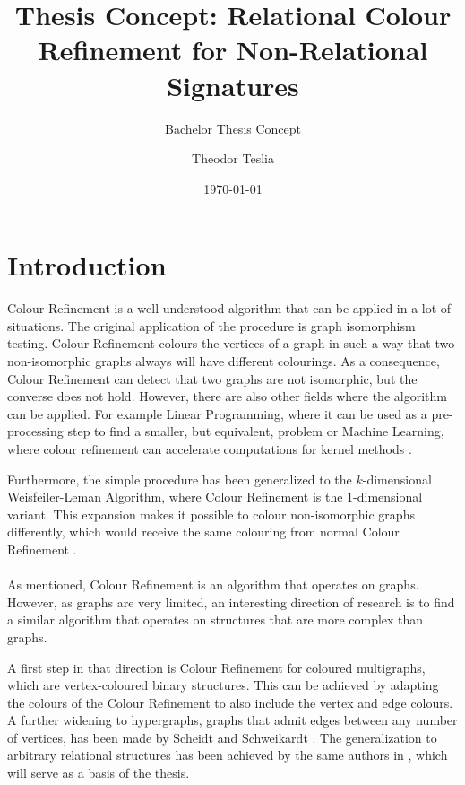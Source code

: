 \documentclass[a4paper,11pt,DIV=15]{scrartcl} %
\theoremstyle{plain}
\theoremstyle{definition}
\begin{document}
\subtitle{Bachelor Thesis Concept}
\date{\today}
\publishers{RWTH Aachen University}	%

\title{Thesis Concept: Relational Colour Refinement for Non-Relational Signatures}

\author{Theodor Teslia}

\maketitle

\section{Introduction}

Colour Refinement is a well-understood algorithm that can be applied in a lot of situations.
The original application of the procedure is graph isomorphism testing.
Colour Refinement colours the vertices of a graph in such a way that two non-isomorphic graphs always will have different colourings.
As a consequence, Colour Refinement can detect that two graphs are not isomorphic, but the converse does not hold.
However, there are also other fields where the algorithm can be applied.
For example Linear Programming, where it can be used as a pre-processing step to find a smaller, but equivalent, problem or Machine Learning, where colour refinement can accelerate computations for kernel methods \cite{grohe2021color}.

Furthermore, the simple procedure has been generalized to the $k$-dimensional Weisfeiler-Leman Algorithm, where Colour Refinement is the $1$-dimensional variant.
This expansion makes it possible to colour non-isomorphic graphs differently, which would receive the same colouring from normal Colour Refinement \cite{kiefer2020power}.
\\ \\
As mentioned, Colour Refinement is an algorithm that operates on graphs.
However, as graphs are very limited, an interesting direction of research is to find a similar algorithm that operates on structures that are more complex than graphs.

A first step in that direction is Colour Refinement for coloured multigraphs, which are vertex-coloured binary structures. 
This can be achieved by adapting the colours of the Colour Refinement to also include the vertex and edge colours. \cite{scheidt2024color}
A further widening to hypergraphs, graphs that admit edges between any number of vertices, has been made by Scheidt and Schweikardt \cite{scheidt2023counting}.
The generalization to arbitrary relational structures has been achieved by the same authors in \cite{scheidt2024color}, which will serve as a basis of the thesis.
\end{document}
